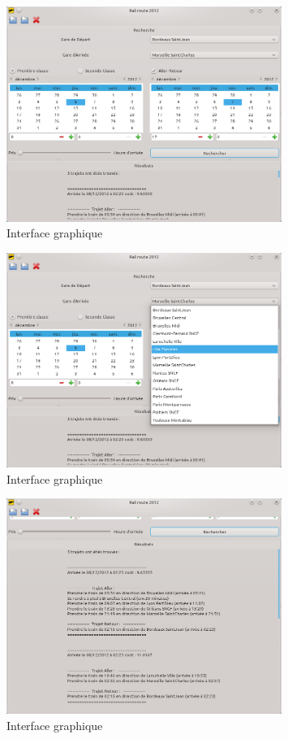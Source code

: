 \documentclass[a4paper,10pt,twoside]{report}
\begin{document}
    \begin{figure}[p]
    \centering
    \includegraphics[width=0.8\textwidth]{screenshot1.png}
    \caption{Interface graphique}
    \label{screen3}
    \end{figure}
     \begin{figure}[p]
    \centering
    \includegraphics[width=0.8\textwidth]{screenshot2.png}
    \caption{Interface graphique}
    \label{screen4}
    \end{figure}
     \begin{figure}[p]
    \centering
    \includegraphics[width=0.8\textwidth]{screenshot3.png}
    \caption{Interface graphique}
    \label{screen5}
    \end{figure}
\end{document}
